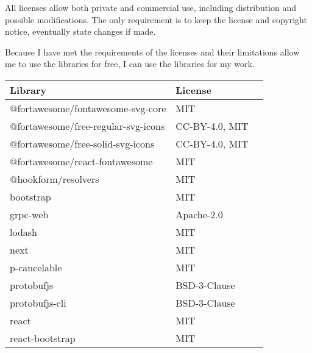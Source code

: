 All licenses allow both private and commercial use, including distribution and possible modifications.
The only requirement is to keep the license and copyright notice, eventually state changes if made.


Because I have met the requirements of the licenses and their limitations allow me to use the libraries for free, I can use the libraries for my work.

\newcommand{\library}[1]{%
    #1\tablefootnote{\url{https://www.npmjs.com/package/#1}}%
}

\newpage
\begin{table}[hbt!]
    \centering
    \captionsetup{justification=centering}
    \begin{tabular}{|l|l|l|}
        \hline
        \textbf{Library}                              & \textbf{License} \\ \hline
        \library{@fortawesome/fontawesome-svg-core}   & MIT              \\ \hline
        \library{@fortawesome/free-regular-svg-icons} & CC-BY-4.0, MIT   \\ \hline
        \library{@fortawesome/free-solid-svg-icons}   & CC-BY-4.0, MIT   \\ \hline
        \library{@fortawesome/react-fontawesome}      & MIT              \\ \hline
        \library{@hookform/resolvers}                 & MIT              \\ \hline
        \library{bootstrap}                           & MIT              \\ \hline
        \library{grpc-web}                            & Apache-2.0       \\ \hline
        \library{lodash}                              & MIT              \\ \hline
        \library{next}                                & MIT              \\ \hline
        \library{p-cancelable}                        & MIT              \\ \hline
        \library{protobufjs}                          & BSD-3-Clause     \\ \hline
        \library{protobufjs-cli}                      & BSD-3-Clause     \\ \hline
        \library{react}                               & MIT              \\ \hline
        \library{react-bootstrap}                     & MIT              \\ \hline

\end{tabular}
\end{table}
